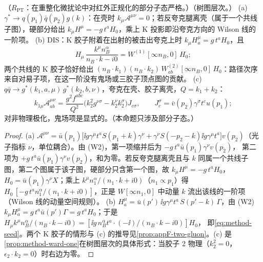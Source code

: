 \begin{proposition}\label{prop:method-ward-tree}
（$R_{\mathrm{PT}}$：在重整化微扰论中对红外正规化的部分子态严格。）（树图层次。）
(a) $\gamma^*\to q(p_1)\bar q(p_2)g(k)$：在壳时 $k_\mu\mathcal A^{\mu\nu}=0$；若反夸克腿离壳（属于一个共线子图），硬部分给出 $k_\mu H^\mu=-g\,t^aH_0$，乘上 K 投影即沿夸克方向的 Wilson 线的一阶项。
(b) DIS：K 胶子附着在出射的被击出夸克上时 $k_\mu H^\mu_a=g\,t^aH_0$，且
\begin{equation}\label{eq:method-seed}
H_\mu\,\frac{k^\mu n_B^\alpha}{n_B\cdot k-i0}=W^{(1)}[\infty n_B,0]\,H_0 ;
\end{equation}
两个共线的 K 胶子恰好给出 $(n_B\cdot k_1)(n_B\cdot k_2)\,W^{(2)}_{ab}[\infty n_B,0]\,H_0$：路径次序来自对易子项，在这一阶没有鬼场或三胶子顶点图的贡献。
(c) $q\bar q\to g^*(k_1,a,\mu)\,g^*(k_2,b,\nu)$，夸克在壳、胶子离壳，$Q=k_1+k_2$：
\begin{equation}\label{eq:method-qqgg}
k_{1\mu}\mathcal A^{\mu\nu}_{ab}=\frac{g^2f^{abc}}{Q^2}\bigl(k_2^2g^{\nu\sigma}-k_2^\nu k_2^\sigma\bigr)J_{c\sigma},\qquad J_c^\sigma=\bar v(p_2)\gamma^\sigma t^cu(p_1) ;
\end{equation}
对非物理极化，鬼场项是显式的。（本命题只涉及部分子态。）
\end{proposition}

\begin{proof}
(a) $\mathcal A^{\mu\nu}=\bar u(p_1)\bigl[\ii g\gamma^\mu t^aS(p_1+k)\gamma^\nu+\gamma^\nu S(-p_2-k)\ii g\gamma^\mu t^a\bigr]v(p_2)$（光子指标 $\nu$，单位耦合）。由 (W2)，第一项缩并后为 $-g\,t^a\bar u(p_1)\gamma^\nu v(p_2)$，
第二项为 $+g\,t^a\bar u(p_1)\gamma^\nu v(p_2)$，和为零。若反夸克腿离壳且与 $k$ 同属一个共线子图，第二个图属于该子图，硬部分只含第一个图，故 $k_\mu H^\mu=-g\,t^aH_0$，
$H_0=\bar u(p_1)\gamma^\nu X$；乘上 $k^\mu n_1^\alpha/(n_1\cdot k+i0)$（$n_1\propto p_1$）得 $H_0\,[-g\,t^an_1^\alpha/(n_1\cdot k+i0)]$，正是 $W[\infty n_1,0]$ 中动量 $k$ 流出该线的一阶项（Wilson 线的动量空间规则）。
(b) $H^\mu_a=\bar u(p')\,\ii g\gamma^\mu t^a\,S(p'-k)\,\Gamma$，由 (W2) $k_\mu H^\mu_a=g\,t^a\bar u(p')\Gamma=g\,t^aH_0$；于是 $H_\mu k^\mu n_B^\alpha/(n_B\cdot k-i0)=[\ii g\,n_B^\alpha t^a\cdot(-\ii)/(n_B\cdot k-i0)]H_0$，
即\cref{eq:method-seed}。两个 K 胶子的情形与 (c) 的推导见\cref{prop:appF-two-gluon}。(c) 是\cref{prop:method-ward-one}在树图层次的具体形式：当胶子 2 物理（$k_2^2=0$，$\epsilon_2\cdot k_2=0$）时右边为零。
\end{proof}

